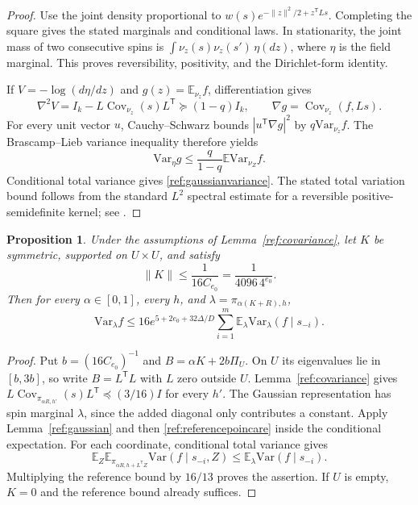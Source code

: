 \documentclass[11pt]{article}
\newcommand{\Var}{\mathrm{Var}}
\def\E{\mathbb{E}}
\newtheorem{proposition}[thm]{Proposition}
\numberwithin{equation}{section}
\begin{document}
\begin{proof}
Use the joint density proportional to
$w(s)e^{-\|z\|^2/2+z^{\mathsf T}Ls}$. Completing the square gives the stated marginals and conditional laws. In stationarity, the joint mass of two consecutive spins is
$\int\nu_z(s)\nu_z(s')\,\eta(dz)$, where $\eta$ is the field marginal. This proves reversibility, positivity, and the Dirichlet-form identity.

If $V=-\log(d\eta/dz)$ and $g(z)=\E_{\nu_z}f$, differentiation gives
\[
 \nabla^2V=I_k-L\operatorname{Cov}_{\nu_z}(s)L^{\mathsf T}\succeq(1-q)I_k,
 \qquad \nabla g=\operatorname{Cov}_{\nu_z}(f,Ls).
\]
For every unit vector $u$, Cauchy--Schwarz bounds
$|u^{\mathsf T}\nabla g|^2$ by $q\Var_{\nu_z}f$.
The Brascamp--Lieb variance inequality \cite{BL76,BK19} therefore yields
\[
 \Var_\eta g\le\frac{q}{1-q}\E\Var_{\nu_Z}f.
\]
Conditional total variance gives \eqref{ref:gaussianvariance}. The stated total variation bound follows from the standard $L^2$ spectral estimate for a reversible positive-semidefinite kernel; see \cite[Chapter~12]{LPW17}.
\end{proof}

\begin{proposition}\label{ref:poincare}
Under the assumptions of Lemma~\ref{ref:covariance}, let $K$ be symmetric, supported on $U\times U$, and satisfy
\[
 \|K\|\le\frac1{16C_{e_0}}=\frac1{4096\,4^{e_0}}.
\]
Then for every $\alpha\in[0,1]$, every $h$, and $\lambda=\pi_{\alpha(K+R),h}$,
\[
 \Var_\lambda f\le16e^{5+2e_0+32\Delta/D}
       \sum_{i=1}^m\E_\lambda\Var_\lambda(f\mid s_{-i}).
\]
\end{proposition}

\begin{proof}
Put $b=(16C_{e_0})^{-1}$ and $B=\alpha K+2b\Pi_U$. On $U$ its eigenvalues lie in $[b,3b]$, so write $B=L^{\mathsf T}L$ with $L$ zero outside $U$. Lemma~\ref{ref:covariance} gives
$L\operatorname{Cov}_{\pi_{\alpha R,h'}}(s)L^{\mathsf T}\preceq(3/16)I$ for every $h'$.
The Gaussian representation has spin marginal $\lambda$, since the added diagonal only contributes a constant. Apply Lemma~\ref{ref:gaussian} and then \eqref{ref:referencepoincare} inside the conditional expectation. For each coordinate, conditional total variance gives
\[
 \E_Z\E_{\pi_{\alpha R,h+L^{\mathsf T}Z}}
  \Var(f\mid s_{-i},Z)
 \le\E_\lambda\Var(f\mid s_{-i}).
\]
Multiplying the reference bound by $16/13$ proves the assertion. If $U$ is empty, $K=0$ and the reference bound already suffices.
\end{proof}
\end{document}
